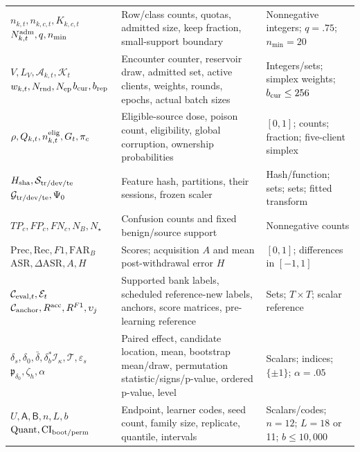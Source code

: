 \documentclass[10pt,a4paper]{article}
\begin{document}
\begin{table}[htbp]
\begin{tabularx}{\linewidth}{L{3.3cm}Y L{4.4cm}}
$n_{k,t},n_{k,c,t},K_{k,c,t}$\newline $N^{\rm adm}_{k,t},q,n_{\min}$ & Row/class counts, quotas, admitted size, keep fraction, small-support boundary & Nonnegative integers; $q=.75$; $n_{\min}=20$\\
$V,L_V,\mathcal A_{k,t},\mathcal K_t$\newline $w_{k,t},N_{\rm rnd},N_{\rm ep}$\newline $b_{\rm cur},b_{\rm rep}$ & Encounter counter, reservoir draw, admitted set, active clients, weights, rounds, epochs, actual batch sizes & Integers/sets; simplex weights; $b_{\rm cur}\le256$\\
$\rho,Q_{k,t},n^{\rm elig}_{k,t},G_t,\pi_c$ & Eligible-source dose, poison count, eligibility, global corruption, ownership probabilities & $[0,1]$; counts; fraction; five-client simplex\\
$H_{\rm sha},\mathcal S_{\rm tr/dev/te}$\newline $\mathcal G_{\rm tr/dev/te},\Psi_0$ & Feature hash, partitions, their sessions, frozen scaler & Hash/function; sets; sets; fitted transform\\
$TP_c,FP_c,FN_c,N_B,N_\star$ & Confusion counts and fixed benign/source support & Nonnegative counts\\
$\mathrm{Prec},\mathrm{Rec},F1,\mathrm{FAR}_B$\newline $\mathrm{ASR},\Delta\mathrm{ASR},A,H$ & Scores; acquisition $A$ and mean post-withdrawal error $H$ & $[0,1]$; differences in $[-1,1]$\\
$\mathcal C_{{\rm eval},t},\mathcal E_t$\newline $\mathcal C_{\rm anchor},R^{\rm acc},R^{F1},\upsilon_j$ & Supported bank labels, scheduled reference-new labels, anchors, score matrices, pre-learning reference & Sets; $T\!\times\!T$; scalar reference\\
$\delta_s,\delta_0,\bar\delta,\delta^*_b$\newline $\mathcal I_\kappa,\mathcal T,\varepsilon_s$\newline $\mathfrak p_{\delta_0},\zeta_h,\alpha$ & Paired effect, candidate location, mean, bootstrap mean/draw, permutation statistic/signs/p-value, ordered p-value, level & Scalars; indices; $\{\pm1\}$; $\alpha=.05$\\
$U,\mathsf A,\mathsf B,n,L,b$\newline $\operatorname{Quant},\mathrm{CI}_{\rm boot/perm}$ & Endpoint, learner codes, seed count, family size, replicate, quantile, intervals & Scalars/codes; $n=12$; $L=18$ or 11; $b\le10{,}000$\\

\end{tabularx}
\end{table}
\end{document}
